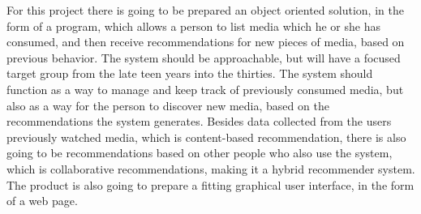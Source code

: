 For this project there is going to be prepared an object oriented solution, in the form of a program, which allows a person to list media which he or she has consumed, and then receive recommendations for new pieces of media, based on previous behavior. The system should be approachable, but will have a focused target group from the late teen years into the thirties. The system should function as a way to manage and keep track of previously consumed media, but also as a way for the person to discover new media, based on the recommendations the system generates. Besides data collected from the users previously watched media, which is content-based recommendation, there is also going to be recommendations based on other people who also use the system, which is collaborative recommendations, making it a hybrid recommender system. The product is also going to prepare a fitting graphical user interface, in the form of a web page.

